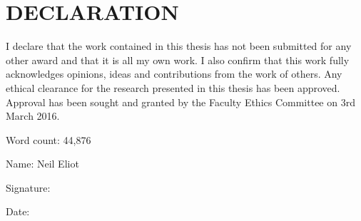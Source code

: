 \chapter*{DECLARATION}
\begin{normalsize}
\singlespacing

I declare that the work contained in this thesis has not been
submitted for any other award and that it is all my own work. I also
confirm that this work fully acknowledges opinions, ideas and
contributions from the work of others. Any ethical clearance for the
research presented in this thesis has been approved. Approval has been
sought and granted by the Faculty Ethics Committee on 3rd March
2016.

\vfill Word count: 44,876

\vfill Name: Neil Eliot

\vfill Signature:

\vfill Date:
\end{normalsize}




